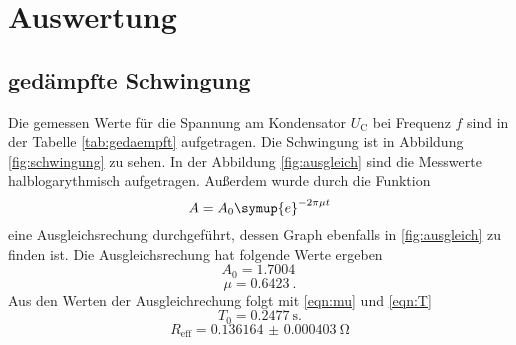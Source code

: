 \section{Auswertung}
\label{sec:Auswertung}

\subsection{gedämpfte Schwingung}
\label{sec:gedaempft}
Die gemessen Werte für die Spannung am Kondensator $U_\text{C}$ bei Frequenz $f$ sind in der Tabelle \ref{tab:gedaempft} aufgetragen.
Die Schwingung ist in Abbildung \ref{fig:schwingung} zu sehen.
In der Abbildung \ref{fig:ausgleich} sind die Messwerte halblogarythmisch aufgetragen.
Außerdem wurde durch die Funktion 
\begin{equation}
    A = A_0 \symup{e}^{-2 \pi \mu t}
\end{equation}
eine Ausgleichsrechung durchgeführt, dessen Graph ebenfalls in \ref{fig:ausgleich} zu finden ist.
Die Ausgleichsrechung hat folgende Werte ergeben
\begin{equation*}
    A_0 = \SI{1.7004}{}
\end{equation*}
\begin{equation*}
    \mu = \SI{0.6423}{}.
\end{equation*}
Aus den Werten der Ausgleichrechung folgt mit \eqref{eqn:mu} und \eqref{eqn:T}
\begin{equation*}
    T_0 = \SI{0.2477}{\second}.
\end{equation*}
\begin{equation*}
    R_\text{eff} = \SI{0.136164(403)}{\ohm}
\end{equation*}

